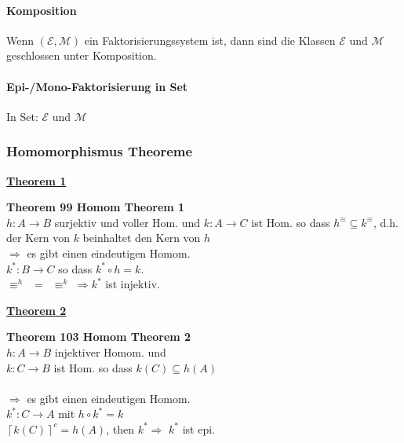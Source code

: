 \paragraph{ Komposition}
Wenn $(\mathcal{E},\mathcal{M})$ ein Faktorisierungssystem ist, dann sind die Klassen $\mathcal{E}$ und $\mathcal{M}$ geschlossen unter Komposition.

\paragraph{ Epi-/Mono-Faktorisierung in Set}
In Set:  $\mathcal{E}$  \epis und $\mathcal{M}$ \monos

\subsubsection{Homomorphismus Theoreme}


\begin{multicols}{2}

\textbf{\underline{Theorem 1}} 

\textbf{Theorem 99 Homom Theorem 1} \\
$h: A \rightarrow B$ surjektiv und voller Hom. und $k: A \rightarrow C$ ist Hom. so dass $h^\equiv \subseteq k^\equiv$, d.h.
der Kern von $k$ beinhaltet den Kern von $h$ \\ $\Rightarrow$ es gibt einen eindeutigen Homom. \\ $k^*: B \rightarrow C$ so dass $k^* \circ h = k$. \\
$\equiv^h \, \, \, = \, \, \,\equiv^k \, \,\Rightarrow k^*$ ist injektiv.


\columnbreak
\textbf{\underline{Theorem 2}} 

\textbf{Theorem 103 Homom Theorem 2} \\
$h: A \rightarrow B$ injektiver Homom. und \\ $k: C \rightarrow B$ ist Hom. so dass $k(C) \subseteq h(A)$ \\ \\ $\Rightarrow$ es  gibt einen eindeutigen Homom. \\ $k^*: C \rightarrow A$ mit $h\circ k^* = k$ \\
$\left\lceil k(C)\right\rceil ^{c}=h(A)$, then $k^{*} \Rightarrow$ $k^*$ ist epi.

\end{multicols}

\newpage 

